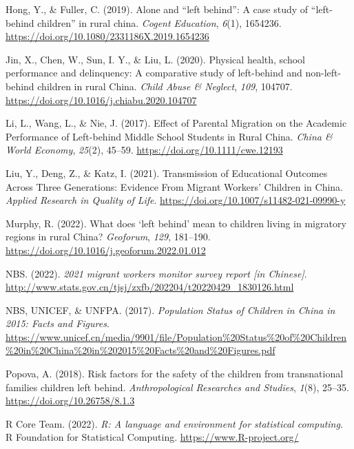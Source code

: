 \documentclass[
  man]{apa7}
\newlength{\cslhangindent}
\newlength{\cslentryspacingunit} %
\newenvironment{CSLReferences}[2] %
 {%
  \setlength{\parindent}{0pt}
  \ifodd #1
  \let\oldpar\par
  \def\par{\hangindent=\cslhangindent\oldpar}
  \fi
  \setlength{\parskip}{#2\cslentryspacingunit}
 }%
 {}
\begin{document}
\begin{CSLReferences}{1}{0}
\leavevmode{}%
Hong, Y., \& Fuller, C. (2019). Alone and {``}left behind{''}: A case study of {``}left-behind children{''} in rural china. \emph{Cogent Education}, \emph{6}(1), 1654236. \url{https://doi.org/10.1080/2331186X.2019.1654236}

\leavevmode{}%
Jin, X., Chen, W., Sun, I. Y., \& Liu, L. (2020). Physical health, school performance and delinquency: A comparative study of left-behind and non-left-behind children in rural China. \emph{Child Abuse \& Neglect}, \emph{109}, 104707. \url{https://doi.org/10.1016/j.chiabu.2020.104707}

\leavevmode{}%
Li, L., Wang, L., \& Nie, J. (2017). Effect of Parental Migration on the Academic Performance of Left-behind Middle School Students in Rural China. \emph{China \& World Economy}, \emph{25}(2), 45--59. \url{https://doi.org/10.1111/cwe.12193}

\leavevmode{}%
Liu, Y., Deng, Z., \& Katz, I. (2021). Transmission of Educational Outcomes Across Three Generations: Evidence From Migrant Workers{'} Children in China. \emph{Applied Research in Quality of Life}. \url{https://doi.org/10.1007/s11482-021-09990-y}

\leavevmode{}%
Murphy, R. (2022). What does {`}left behind{'} mean to children living in migratory regions in rural China? \emph{Geoforum}, \emph{129}, 181--190. \url{https://doi.org/10.1016/j.geoforum.2022.01.012}

\leavevmode{}%
NBS. (2022). \emph{2021 migrant workers monitor survey report {[}in Chinese{]}}. \url{http://www.stats.gov.cn/tjsj/zxfb/202204/t20220429_1830126.html}

\leavevmode{}%
NBS, UNICEF, \& UNFPA. (2017). \emph{Population Status of Children in China in 2015: Facts and Figures}. \url{https://www.unicef.cn/media/9901/file/Population\%20Status\%20of\%20Children\%20in\%20China\%20in\%202015\%20Facts\%20and\%20Figures.pdf}

\leavevmode{}%
Popova, A. (2018). Risk factors for the safety of the children from transnational families children left behind. \emph{Anthropological Researches and Studies}, \emph{1}(8), 25--35. \url{https://doi.org/10.26758/8.1.3}

\leavevmode{}%
R Core Team. (2022). \emph{R: A language and environment for statistical computing}. R Foundation for Statistical Computing. \url{https://www.R-project.org/}


\end{CSLReferences}
\end{document}
